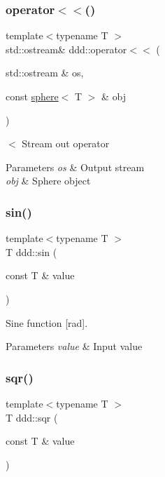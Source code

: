 \subsubsection{\texorpdfstring{operator$<$$<$()}{operator<<()}\hspace{0.1cm}{\footnotesize\ttfamily [10/10]}}
{\footnotesize\ttfamily template$<$typename T $>$ \\
std\+::ostream\& ddd\+::operator$<$$<$ (\begin{DoxyParamCaption}\item[{std\+::ostream \&}]{os,  }\item[{const \hyperlink{classddd_1_1sphere}{sphere}$<$ T $>$ \&}]{obj }\end{DoxyParamCaption})\hspace{0.3cm}{\ttfamily [inline]}}



$<$ Stream out operator 


\begin{DoxyParams}{Parameters}
{\em os} & Output stream \\
\hline
{\em obj} & Sphere object \\
\hline
\end{DoxyParams}
\mbox{\label{namespaceddd_a3c2355d52318b82d63a4ff3525bb651a}} 
\subsubsection{\texorpdfstring{sin()}{sin()}}
{\footnotesize\ttfamily template$<$typename T $>$ \\
T ddd\+::sin (\begin{DoxyParamCaption}\item[{const T \&}]{value }\end{DoxyParamCaption})\hspace{0.3cm}{\ttfamily [inline]}}



Sine function \mbox{[}rad\mbox{]}. 


\begin{DoxyParams}{Parameters}
{\em value} & Input value \\
\hline
\end{DoxyParams}
\mbox{\label{namespaceddd_a1d4703ab7fa9c58943ff44b368dacb4b}} 
\subsubsection{\texorpdfstring{sqr()}{sqr()}}
{\footnotesize\ttfamily template$<$typename T $>$ \\
T ddd\+::sqr (\begin{DoxyParamCaption}\item[{const T \&}]{value }\end{DoxyParamCaption})\hspace{0.3cm}{\ttfamily [inline]}}



